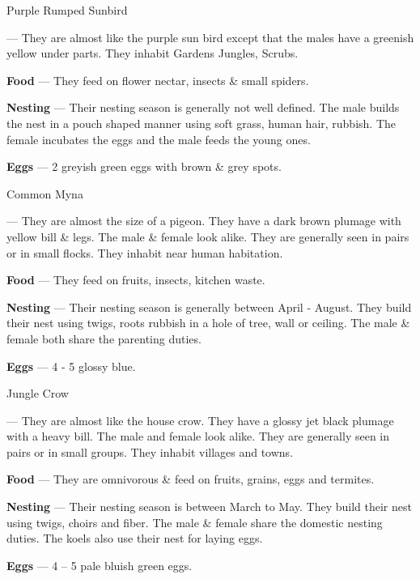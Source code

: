 \begin{bird}{Purple Rumped Sunbird}

 --- They are almost like the purple sun bird except that the males have a greenish yellow under parts. They inhabit Gardens Jungles, Scrubs.

{\large\bf Food} --- They feed on flower nectar, insects \& small spiders.

{\large\bf Nesting} --- Their nesting season is generally not well defined. The male builds the nest in a pouch shaped manner using soft grass, human hair, rubbish.  The female incubates the eggs and the male feeds the young ones.

{\large\bf Eggs} --- 2 greyish green eggs with brown \& grey spots.
\end{bird}

\begin{bird}{Common Myna}

 --- They are almost the size of a pigeon. They have a dark brown plumage with yellow bill \& legs. The male \& female look alike. They are generally seen in pairs or in small flocks. They inhabit near human habitation.

{\large\bf Food} --- They feed on fruits, insects, kitchen waste. 

{\large\bf Nesting} --- Their nesting season is generally between April - August. They build their nest using twigs, roots rubbish in a hole of tree, wall or ceiling. The male \& female both share the parenting duties.

{\large\bf Eggs} --- 4 - 5 glossy blue.
\end{bird}

\begin{bird}{Jungle Crow}

 --- They are almost like the house crow. They have a glossy jet black plumage with a heavy bill. The male and female look alike. They are generally seen in pairs or in small groups. They inhabit villages and towns. 

{\large\bf Food} --- They are omnivorous \& feed on fruits, grains, eggs and termites.

{\large\bf Nesting} --- Their nesting season is between March to May. They build their nest using twigs, choirs and fiber. The male \& female share the domestic nesting duties. The koels also use their nest for laying eggs. 

{\large\bf Eggs} --- 4 -- 5 pale bluish green eggs.
\end{bird}

